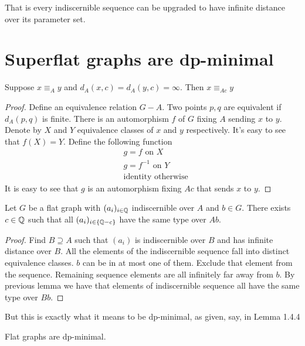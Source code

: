 That is every indiscernible sequence can be upgraded to have infinite distance over its parameter set.

\section{Superflat graphs are dp-minimal}

\begin{Lemma}
	Suppose $x \equiv_A y$ and $d_A(x, c) = d_A(y, c) = \infty$. Then $x \equiv_{Ac} y$
\end{Lemma}

\begin{proof}
	Define an equivalence relation $G - A$. Two points $p, q$ are equivalent if $d_A(p,q)$ is finite. There is an automorphism $f$ of $G$ fixing $A$ sending $x$ to $y$. Denote by $X$ and $Y$ equivalence classes of $x$ and $y$ respectively. It's easy to see that $f(X) = Y$. Define the following function
	\begin{align*}
		&g = f \text { on } X \\
		&g = f^{-1} \text { on } Y \\
		&\text{identity otherwise}
	\end{align*}
	It is easy to see that $g$ is an automorphism fixing $Ac$ that sends $x$ to $y$.
\end{proof}

\begin{Theorem}
	Let $G$ be a flat graph with $(a_i)_{i\in\mathbb{Q}}$ indiscernible over $A$ and $b \in G$. There exists $c \in \mathbb{Q}$ such that all $(a_i)_{i\in\{\mathbb{Q} - c\}}$ have the same type over $Ab$.
\end{Theorem}

\begin{proof}
	Find $B \supseteq A$ such that $(a_i)$ is indiscernible over $B$ and has infinite distance over $B$. All the elements of the indiscernible sequence fall into distinct equivalence classes. $b$ can be in at most one of them. Exclude that element from the sequence. Remaining sequence elements are all infinitely far away from $b$. By previous lemma we have that elements of indiscernible sequence all have the same type over $Bb$.
\end{proof}

But this is exactly what it means to be dp-minimal, as given, say, in \cite{simon_dp_min} Lemma 1.4.4

\begin{Corollary}
	Flat graphs are dp-minimal.
\end{Corollary}
